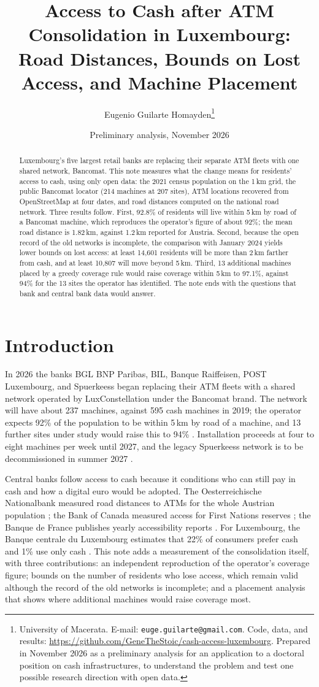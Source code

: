 \documentclass[11pt]{article}
\title{Access to Cash after ATM Consolidation in Luxembourg:\\ Road Distances, Bounds on Lost Access, and Machine Placement}
\author{Eugenio Guilarte Homayden\thanks{University of Macerata. E-mail: \texttt{euge.guilarte@gmail.com}. Code, data, and results: \url{https://github.com/GeneTheStoic/cash-access-luxembourg}. Prepared in November 2026 as a preliminary analysis for an application to a doctoral position on cash infrastructures, to understand the problem and test one possible research direction with open data.}}
\date{Preliminary analysis, November 2026}
\begin{document}
\maketitle

\begin{abstract}
\noindent Luxembourg's five largest retail banks are replacing their separate ATM fleets with one shared network, Bancomat. This note measures what the change means for residents' access to cash, using only open data: the 2021 census population on the 1\,km grid, the public Bancomat locator (214 machines at 207 sites), ATM locations recovered from OpenStreetMap at four dates, and road distances computed on the national road network. Three results follow. First, 92.8\% of residents will live within 5\,km by road of a Bancomat machine, which reproduces the operator's figure of about 92\%; the mean road distance is 1.82\,km, against 1.2\,km reported for Austria. Second, because the open record of the old networks is incomplete, the comparison with January 2024 yields lower bounds on lost access: at least 14,601 residents will be more than 2\,km farther from cash, and at least 10,807 will move beyond 5\,km. Third, 13 additional machines placed by a greedy coverage rule would raise coverage within 5\,km to 97.1\%, against 94\% for the 13 sites the operator has identified. The note ends with the questions that bank and central bank data would answer.
\end{abstract}

\section{Introduction}
In 2026 the banks BGL BNP Paribas, BIL, Banque Raiffeisen, POST Luxembourg, and Spuerkeess began replacing their ATM fleets with a shared network operated by LuxConstellation under the Bancomat brand. The network will have about 237 machines, against 595 cash machines in 2019; the operator expects 92\% of the population to be within 5\,km by road of a machine, and 13 further sites under study would raise this to 94\% \citep{paperjam2026}. Installation proceeds at four to eight machines per week until 2027, and the legacy Spuerkeess network is to be decommissioned in summer 2027 \citep{spuerkeess2026}.

Central banks follow access to cash because it conditions who can still pay in cash and how a digital euro would be adopted. The Oesterreichische Nationalbank measured road distances to ATMs for the whole Austrian population \citep{stix2020}; the Bank of Canada measured access for First Nations reserves \citep{chen2021}; the Banque de France publishes yearly accessibility reports \citep{bdf2025}. For Luxembourg, the Banque centrale du Luxembourg estimates that 22\% of consumers prefer cash and 1\% use only cash \citep{giordana2026}. This note adds a measurement of the consolidation itself, with three contributions: an independent reproduction of the operator's coverage figure; bounds on the number of residents who lose access, which remain valid although the record of the old networks is incomplete; and a placement analysis that shows where additional machines would raise coverage most.
\end{document}
